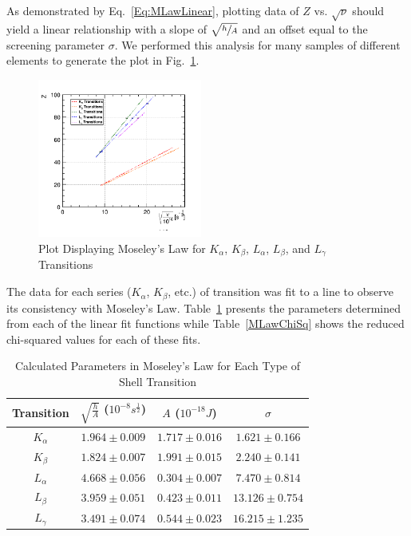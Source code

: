 \documentclass[%
 reprint,
 amsmath,amssymb,
 aps,
 pra,
]{revtex4-1}
\begin{document}
As demonstrated by Eq.~\ref{Eq:MLawLinear}, plotting data of $Z$ vs. $\sqrt{\nu}$ should yield a linear relationship with a slope of $\sqrt{\sfrac{h}{A}}$ and an offset equal to the screening parameter $\sigma$. We performed this analysis for many samples of different elements to generate the plot in Fig.~\ref{Fig:MLawPlot}.
\begin{figure}[H]
	\centering
	\includegraphics[width=0.48\textwidth]{MoseleyLawPlot.png}
	\caption{Plot Displaying Moseley's Law for $K_{\alpha}$, $K_{\beta}$, $L_{\alpha}$, $L_{\beta}$, and $L_{\gamma}$ Transitions}
	\label{Fig:MLawPlot}
\end{figure} 

The data for each series ($K_{\alpha}$, $K_{\beta}$, etc.) of transition was fit to a line to observe its consistency with Moseley's Law. Table~\ref{Tab:MLawData} presents the parameters determined from each of the linear fit functions while Table~\ref{MLawChiSq} shows the reduced chi-squared values for each of these fits.
\begin{table}[htbp]
	\begin{center}
		\begin{tabular}{|c|c|c|c|}
			\hline Transition & $\sqrt{\frac{h}{A}}$ ($ 10^{-8} s^{\frac{1}{2}}$)  & $A$ ($10^{-18} J$) & $\sigma$ \\
			\hline $K_{\alpha}$ & $1.964 \pm 0.009$ & $1.717 \pm 0.016$ & $1.621 \pm 0.166$ \\
			\hline $K_{\beta}$ & $1.824 \pm 0.007$ & $1.991 \pm 0.015$ & $2.240 \pm 0.141$ \\
			\hline $L_{\alpha}$ & $4.668 \pm 0.056$ & $0.304 \pm 0.007$ & $7.470 \pm 0.814$ \\
			\hline $L_{\beta}$ & $3.959 \pm 0.051$ & $0.423 \pm 0.011$ & $13.126 \pm 0.754$ \\
			\hline $L_{\gamma}$ & $3.491 \pm 0.074$ & $0.544 \pm 0.023$ & $16.215 \pm 1.235$ \\
			\hline
		\end{tabular}
	\end{center}
	\caption{Calculated Parameters in Moseley's Law for Each Type of Shell Transition}
	\label{Tab:MLawData}
\end{table}
\end{document}
